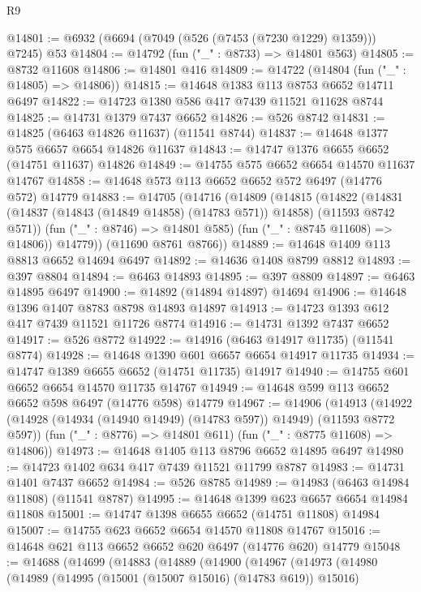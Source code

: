 \begin{lexlean}{R9}
\begin{coremodule}
{{{{{{{{{{{{{{{{{{{{{{{{{{{{{{{{{{{{{{{{{{{{{{{{{{{{{{{{{{{{{{{{{{{{{{{{{{{{{{{{{{{{@14801 := @6932 (@6694 (@7049 (@526 (@7453 (@7230 @1229) @1359))) @7245) @53
@14804 := @14792 (fun ("_" : @8733) => @14801 @563)
@14805 := @8732 @11608
@14806 := @14801 @416
@14809 := @14722 (@14804 (fun ("_" : @14805) => @14806))
@14815 := @14648 @1383 @113 @8753 @6652 @14711 @6497
@14822 := @14723 @1380 @586 @417 @7439 @11521 @11628 @8744
@14825 := @14731 @1379 @7437 @6652
@14826 := @526 @8742
@14831 := @14825 (@6463 @14826 @11637) (@11541 @8744)
@14837 := @14648 @1377 @575 @6657 @6654 @14826 @11637
@14843 := @14747 @1376 @6655 @6652 (@14751 @11637) @14826
@14849 := @14755 @575 @6652 @6654 @14570 @11637 @14767
@14858 := @14648 @573 @113 @6652 @6652 @572 @6497 (@14776 @572) @14779
@14883 := @14705
    (@14716
      (@14809
        (@14815
          (@14822
            (@14831 (@14837 (@14843 (@14849 @14858) (@14783 @571)) @14858) (@11593 @8742 @571))
            (fun ("_" : @8746) => @14801 @585)
            (fun ("_" : @8745 @11608) => @14806))
          @14779))
      (@11690 @8761 @8766))
@14889 := @14648 @1409 @113 @8813 @6652 @14694 @6497
@14892 := @14636 @1408 @8799 @8812
@14893 := @397 @8804
@14894 := @6463 @14893
@14895 := @397 @8809
@14897 := @6463 @14895 @6497
@14900 := @14892 (@14894 @14897) @14694
@14906 := @14648 @1396 @1407 @8783 @8798 @14893 @14897
@14913 := @14723 @1393 @612 @417 @7439 @11521 @11726 @8774
@14916 := @14731 @1392 @7437 @6652
@14917 := @526 @8772
@14922 := @14916 (@6463 @14917 @11735) (@11541 @8774)
@14928 := @14648 @1390 @601 @6657 @6654 @14917 @11735
@14934 := @14747 @1389 @6655 @6652 (@14751 @11735) @14917
@14940 := @14755 @601 @6652 @6654 @14570 @11735 @14767
@14949 := @14648 @599 @113 @6652 @6652 @598 @6497 (@14776 @598) @14779
@14967 := @14906
    (@14913
      (@14922 (@14928 (@14934 (@14940 @14949) (@14783 @597)) @14949) (@11593 @8772 @597))
      (fun ("_" : @8776) => @14801 @611)
      (fun ("_" : @8775 @11608) => @14806))
@14973 := @14648 @1405 @113 @8796 @6652 @14895 @6497
@14980 := @14723 @1402 @634 @417 @7439 @11521 @11799 @8787
@14983 := @14731 @1401 @7437 @6652
@14984 := @526 @8785
@14989 := @14983 (@6463 @14984 @11808) (@11541 @8787)
@14995 := @14648 @1399 @623 @6657 @6654 @14984 @11808
@15001 := @14747 @1398 @6655 @6652 (@14751 @11808) @14984
@15007 := @14755 @623 @6652 @6654 @14570 @11808 @14767
@15016 := @14648 @621 @113 @6652 @6652 @620 @6497 (@14776 @620) @14779
@15048 := @14688
    (@14699
      (@14883
        (@14889
          (@14900
            (@14967
              (@14973
                (@14980
                  (@14989
                    (@14995 (@15001 (@15007 @15016) (@14783 @619)) @15016)
}}}}}}}}}}}}}}}}}}}}}}}}}}}}}}}}}}}}}}}}}}}}}}}}}}}}}}}}}}}}}}}}}}}}}}}}}}}}}}}}}}}}
\end{coremodule}
\end{lexlean}
